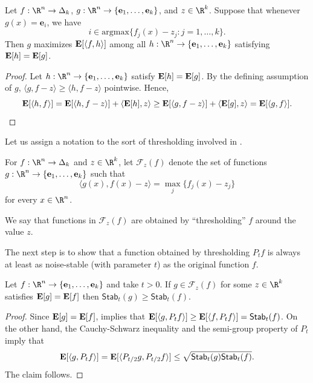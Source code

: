 \documentclass{toc}
\newcommand{\E}{{\bf E}}
\newcommand{\inr}[2]{\langle #1, #2 \rangle}
\newcommand{\calF}{\mathcal{F}}
\newcommand{\Stab}{\mathsf{Stab}}
\begin{document}
\begin{lemma}\label{lem:rounding-correlation}
  Let $f: \R^n \to \Delta_k$, $g: \R^n \to \{\mathbf{e}_1, \dots, \mathbf{e}_k\}$, and $z \in \R^k$.
  Suppose that whenever $g(x) = \mathbf{e}_i$, we have
  \[
    i \in \mathrm{argmax}\{f_j(x) - z_j: j = 1, \dots, k\}.
  \]
  Then $g$ maximizes $\E[\langle f, h \rangle]$ among all
  $h: \R^n \to \{\mathbf{e}_1, \dots, \mathbf{e}_k\}$ satisfying $\E [h] = \E[g]$.
\end{lemma}

\begin{proof}
  Let $h: \R^n \to \{\mathbf{e}_1, \dots, \mathbf{e}_k\}$ satisfy $\E[h] = \E[g]$. By the defining assumption of $g$,
  $\inr{g}{f-z} \ge \inr{h}{f-z}$ pointwise. Hence,
  \[
    \E[\inr{h}{f}] = \E[\inr{h}{f-z}] + \inr{\E[h]}{z} \ge \E[\inr{g}{f-z}] + \inr{\E[g]}{z} = \E[\inr{g}{f}]. \qedhere
  \]
\end{proof}

Let us assign a notation to the sort of thresholding involved in .

\begin{definition}
  For $f: \R^n \to \Delta_k$ and $z \in \R^k$, let $\calF_z(f)$ denote the set of functions $g: \R^n \to \{\mathbf{e}_1, \dots, \mathbf{e}_k\}$
  such that
  \[
      \langle g(x), f(x) - z \rangle = \max_j \{f_j(x) - z_j\}
  \]
  for every $x \in \R^n$.
\end{definition}

We say that functions in $\calF_z(f)$ are obtained by ``thresholding'' $f$ around the value $z$.

The next step is to show that a function obtained by thresholding $P_t f$ is always at least as noise-stable (with parameter $t$)
as the original function $f$. 

\begin{lemma}\label{lem:rounding-stability}
  Let $f: \R^n \to \{\mathbf{e}_1, \dots, \mathbf{e}_k\}$ and take $t > 0$. If $g \in \calF_z(f)$ for some $z \in \R^k$
  satisfies $\E[g] = \E[f]$
  then $\Stab_t(g) \ge \Stab_t(f)$.
\end{lemma}

\begin{proof}
  Since $\E[g] = \E[f]$,  implies that
  $\E[\langle g, P_t f\rangle] \ge \E[\langle f, P_t f\rangle] = \Stab_t(f)$. On the other hand,
  the Cauchy-Schwarz inequality and the semi-group property of $P_t$ imply that
  \[
    \E[\langle g, P_t f \rangle]
    = \E[\langle P_{t/2} g, P_{t/2} f \rangle]
    \le \sqrt{\Stab_t(g) \Stab_t(f)}.
  \]
  The claim follows.
\end{proof}
\end{document}
